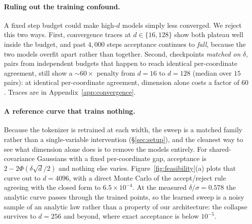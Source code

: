 \documentclass[10pt]{article}
\newcommand{\dd}{d}
\begin{document}
\paragraph{Ruling out the training confound.} A fixed step budget could make high-$\dd$ models simply
less converged. We reject this two ways. First, convergence traces at $\dd \in \{16,128\}$ show both
plateau well inside the budget, and past $4{,}000$ steps acceptance continues to \emph{fall}, because
the two models overfit apart rather than together. Second, checkpoints \emph{matched on $\delta$},
pairs from independent budgets that happen to reach identical per-coordinate agreement, still show a
$\sim$$60\times$ penalty from $\dd{=}16$ to $\dd{=}128$ (median over $15$ pairs): at identical
per-coordinate agreement, dimension alone costs a factor of $60$. Traces are in
Appendix~\ref{app:convergence}.

\paragraph{A reference curve that trains nothing.} Because the tokenizer is retrained at each width,
the sweep is a matched family rather than a single-variable intervention (\S\ref{sec:setup}), and the
cleanest way to see what dimension alone does is to remove the models entirely. For shared-covariance
Gaussians with a fixed per-coordinate gap, acceptance is $2 - 2\Phi(\delta\sqrt{\dd}/2)$ and nothing
else varies. Figure~\ref{fig:feasibility}(a) plots that curve out to $\dd = 4096$, with a direct
Monte Carlo of the accept/reject rule agreeing with the closed form to $6.5\times10^{-4}$. At the
measured $\delta/\sigma = 0.578$ the analytic curve passes through the trained points, so the
learned sweep is a noisy sample of an analytic law rather than a property of our architecture: the
collapse survives to $\dd = 256$ and beyond, where exact acceptance is below $10^{-5}$.
\end{document}
